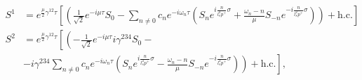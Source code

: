 \begin{equation}
\begin{aligned}
S^1 &= e^{\frac{\mu}{2} \gamma^{12} \tau} 
\left[ \left(
\frac{1}{\sqrt{2}} e^{- i \mu \tau} S_0 -
 \sum_{n \neq 0} c_n e^{-i \omega_n \tau} \left( S_n e^{i \frac{n}{l_s^2 p^+} \sigma}
                  + \frac{\omega_n - n}{\mu} S_{-n} e^{-i \frac{n}{l_s^2 p^+} \sigma} \right)
\right) + \textrm{h.c.} \right]   \\
S^2 &= e^{\frac{\mu}{2} \gamma^{12} \tau} 
\left[ \left(
-\frac{1}{\sqrt{2}} e^{- i \mu \tau} i \gamma^{234}S_0 -  \right. \right. \\
      &  \left. \left.   - i \gamma^{234}
 \sum_{n \neq 0} c_n e^{-i \omega_n \tau} \left( S_n e^{i \frac{n}{l_s^2 p^+} \sigma}
                  - \frac{\omega_n - n}{\mu} S_{-n} e^{-i \frac{n}{l_s^2 p^+} \sigma} \right)
\right) + \textrm{h.c.} \right],
\end{aligned}
\end{equation}

